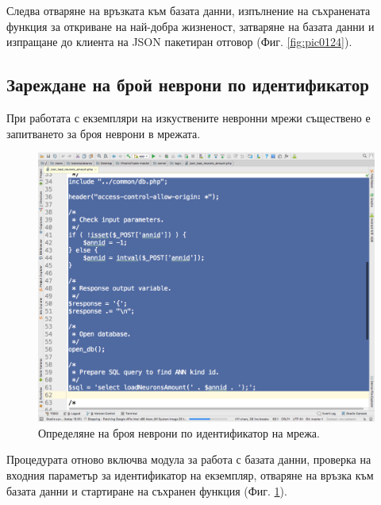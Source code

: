 \documentclass[book,14pt,oneside,openany]{memoir}
\begin{document}
Следва отваряне на връзката към базата данни, изпълнение на съхранената функция за откриване на най-добра жизненост, затваряне на базата данни и изпращане до клиента на JSON пакетиран отговор (Фиг. \ref{fig:pic0124}).

\subsection{Зареждане на брой неврони по идентификатор}

При работата с екземпляри на изкуствените невронни мрежи съществено е запитването за броя неврони в мрежата. 

\begin{figure}[h]
  \centering
  \includegraphics[height=0.45\pdfpageheight]{pic0125}
  \caption{Определяне на броя неврони по идентификатор на мрежа.}
\label{fig:pic0125}
\end{figure}
\FloatBarrier

Процедурата отново включва модула за работа с базата данни, проверка на входния параметър за идентификатор на екземпляр, отваряне на връзка към базата данни и стартиране на съхранен функция (Фиг. \ref{fig:pic0125}).
\end{document}
